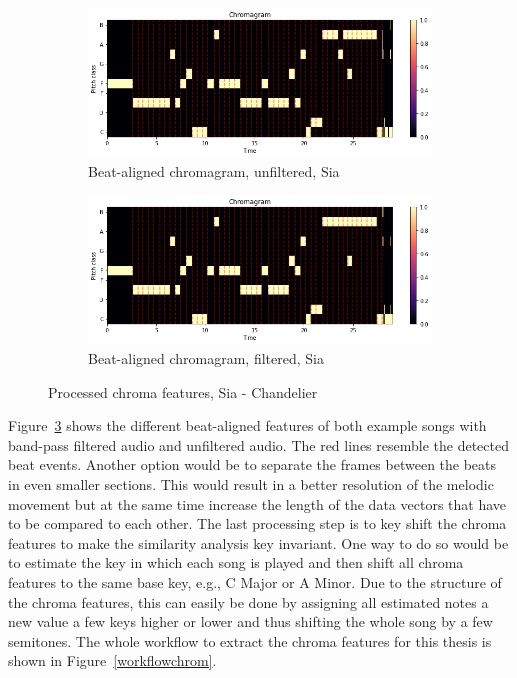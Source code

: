 \begin{figure}[htbp]
{{			\begin{subfigure}{.495\textwidth}
				\centering    
				\includegraphics[scale=0.3]{Images/Chroma/siaunfiltered.png}
				\caption{Beat-aligned chromagram, unfiltered, Sia}
				\label{siaub}
			\end{subfigure}
			\begin{subfigure}{.495\textwidth}
				\centering     
				\includegraphics[scale=0.3]{Images/Chroma/siafiltered.png}
				\caption{Beat-aligned chromagram, filtered, Sia}
				\label{siafb}
			\end{subfigure}%
	}}
	\caption{Processed chroma features, Sia - Chandelier}
	\label{beataligned}
\end{figure}
\FloatBarrier
\noindent Figure~\ref{beataligned} shows the different beat-aligned features of both example songs with band-pass filtered audio and unfiltered audio. The red lines resemble the detected beat events.
\noindent Another option would be to separate the frames between the beats in even smaller sections. This would result in a better resolution of the melodic movement but at the same time increase the length of the data vectors that have to be compared to each other.
\noindent The last processing step is to key shift the chroma features to make the similarity analysis key invariant. One way to do so would be to estimate the key in which each song is played and then shift all chroma features to the same base key, e.g., C Major or A Minor. Due to the structure of the chroma features, this can easily be done by assigning all estimated notes a new value a few keys higher or lower and thus shifting the whole song by a few semitones. The whole workflow to extract the chroma features for this thesis is shown in Figure~\ref{workflowchrom}.\\
